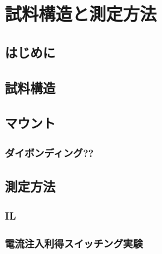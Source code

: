 \chapter{試料構造と測定方法}
\label{chap:simulation}

\section{はじめに}

\section{試料構造}
\section{マウント}
\subsection{ダイボンディング??}
\section{測定方法}
\subsection{IL}
\subsection{電流注入利得スイッチング実験}
